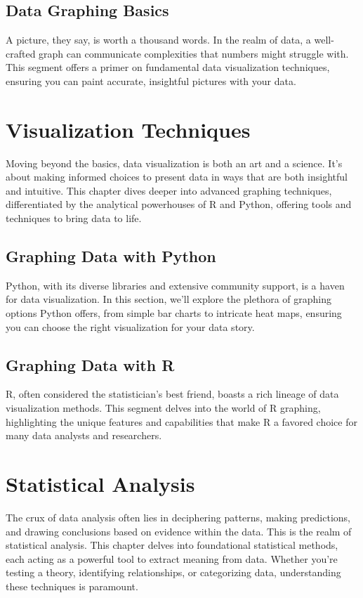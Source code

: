 \documentclass[a4paper,12pt]{book}
\begin{document}
\section{Data Graphing Basics}
A picture, they say, is worth a thousand words. In the realm of data, a well-crafted graph can communicate complexities that numbers might struggle with. This segment offers a primer on fundamental data visualization techniques, ensuring you can paint accurate, insightful pictures with your data.

\chapter{Visualization Techniques}
Moving beyond the basics, data visualization is both an art and a science. It's about making informed choices to present data in ways that are both insightful and intuitive. This chapter dives deeper into advanced graphing techniques, differentiated by the analytical powerhouses of R and Python, offering tools and techniques to bring data to life.

\section{Graphing Data with Python}
Python, with its diverse libraries and extensive community support, is a haven for data visualization. In this section, we'll explore the plethora of graphing options Python offers, from simple bar charts to intricate heat maps, ensuring you can choose the right visualization for your data story.

\section{Graphing Data with R}
R, often considered the statistician's best friend, boasts a rich lineage of data visualization methods. This segment delves into the world of R graphing, highlighting the unique features and capabilities that make R a favored choice for many data analysts and researchers.

\chapter{Statistical Analysis}
The crux of data analysis often lies in deciphering patterns, making predictions, and drawing conclusions based on evidence within the data. This is the realm of statistical analysis. This chapter delves into foundational statistical methods, each acting as a powerful tool to extract meaning from data. Whether you're testing a theory, identifying relationships, or categorizing data, understanding these techniques is paramount.
\end{document}
